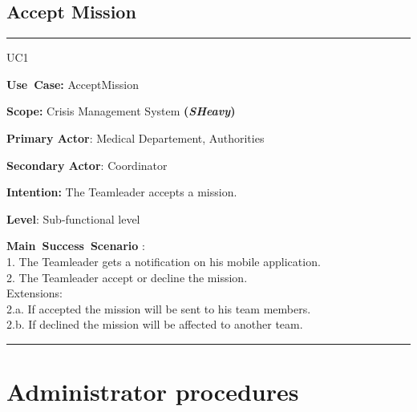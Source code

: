 \subsection{Accept Mission}
\vspace{0.5cm}
\hrule
\vspace{0.5cm}
\begin{lyxlist}{UC1}
\small{
\item [\textbf{Use~Case:}] AcceptMission
\item [\textbf{Scope:}] Crisis Management System \textbf{(\emph{SHeavy})}
\item [\textbf{Primary Actor}:] Medical Departement, Authorities
\item [\textbf{Secondary Actor}:] Coordinator
\item [\textbf{Intention:}]The Teamleader accepts a mission.
\item [\textbf{Level}:]Sub-functional level
\item [\textbf{Main~Success~Scenario}]:\\
1. The Teamleader gets a notification on his mobile application.\\
2. The Teamleader accept or decline the mission.\\
Extensions:\\
	2.a. If accepted the mission will be sent to his team members.\\
	2.b. If declined the mission will be affected to another team.\\ 
}
\end{lyxlist}
\hrule 
\vspace{0.5cm} 

\section{Administrator procedures}

